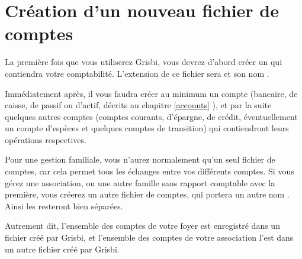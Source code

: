 \section{Création d'un nouveau fichier de comptes\label{start-newfile}}


La première fois que vous utiliserez Grisbi, vous devrez d'abord créer un  qui contiendra votre comptabilité. L'\gls{extension} de ce fichier sera  et son nom . 

Immédiatement après, il vous faudra créer au minimum un compte (bancaire, de caisse, de passif ou d'actif, décrits au chapitre \vref{accounts} ), et par la suite quelques autres comptes (comptes courants, d'épargne, de crédit, éventuellement un compte d'espèces et quelques comptes de transition) qui contiendront leurs opérations respectives. 

Pour une gestion familiale, vous n'aurez normalement qu'un seul fichier de comptes, car cela permet tous les échanges entre vos différents comptes. Si vous gérez une association, ou une autre famille sans rapport comptable avec la première, vous créerez un autre fichier de comptes, qui portera un autre nom . Ainsi les  resteront bien séparées.

Autrement dit, l’ensemble des comptes de votre foyer est enregistré dans un fichier créé par Grisbi,
et l’ensemble des comptes de votre association l’est dans un autre fichier créé par Grisbi.



